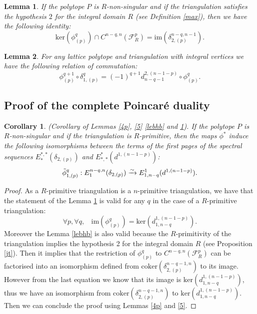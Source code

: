 \documentclass{article}
\newtheorem{lemma}{Lemma}
\newtheorem{corollary}{Corollary}
\begin{document}
\begin{lemma}
    If the polytope $P$ is $R$-non-singular and if the triangulation satisfies the hypothesis $2$ for the integral domain $R$ (see Definition \ref{max}), then we have the following identity:
    \begin{equation*}
        \mathrm{ker}(\phi^q_{(p)}) \cap C^{n-q,n}(\mathcal{F}^p_R) = \mathrm{im}(\delta_{2,(p)}^{n-q,n-1}).
    \end{equation*}
    \label{ejnf}
\end{lemma}

\begin{lemma}
    For any lattice polytope and triangulation with integral vertices we have the following relation of commutation:
    \begin{equation*}
        \phi^{q+1}_{(p)} \circ \delta_{1,(p)}^q = (-1)^{q+1} d^{2,(n-1-p)}_{n-q-1} \circ \phi^q_{(p)}.
    \end{equation*}
    \label{8}
\end{lemma}

\subsection{Proof of the complete Poincaré duality}

\begin{corollary}
    (Corollary of Lemmas \ref{4p}, \ref{5} \ref{lebhb} and \ref{ejnf}). If the polytope $P$ is $R$-non-singular and if the triangulation is $R$-primitive, then the maps $\phi^*$ induce the following isomorphisms between the terms of the first pages of the spectral sequences $E_*^{*,*}(\delta_{2,(p)})$ and $E^*_{*,*}(d^{1,(n-1-p)})$:
    \begin{equation*}
        \Tilde{\phi}^q_{1,(p)}: E_1^{n-q,n}(\delta_{2,(p)}) \xrightarrow{\sim} E^1_{1,n-q}(d^{1,(n-1-p)}).
    \end{equation*}
\end{corollary}

\begin{proof}
    As a $R$-primitive triangulation is a $n$-primitive triangulation, we have that the statement of the Lemma \ref{ejnf} is valid for any $q$ in the case of a $R$-primitive triangulation:
    \begin{equation*}
        \forall p,\forall q, ~~~~\mathrm{im}(\phi^q_{(p)}) = \mathrm{ker}(d^{1,(n-1-p)}_{1,n-q}).
    \end{equation*}
    Moreover the Lemma \ref{lebhb} is also valid because the $R$-primitivity of the triangulation implies the hypothesis 2 for the integral domain $R$ (see Proposition \ref{jt}). Then it implies that the restriction of $\phi^q_{(p)}$ to $C^{n-q,n}(\mathcal{F}^p_R)$ can be factorised into an isomorphism defined from $\mathrm{coker}(\delta_{2,(p)}^{n-q-1,n})$ to its image. However from the last equation we know that its image is $\mathrm{ker}(d^{1,(n-1-p)}_{1,n-q})$, thus we have an isomorphism from $\mathrm{coker}(\delta_{2,(p)}^{n-q-1,n})$ to $\mathrm{ker}(d^{1,(n-1-p)}_{1,n-q})$. Then we can conclude the proof using Lemmas \ref{4p} and \ref{5}.
\end{proof}
\end{document}
